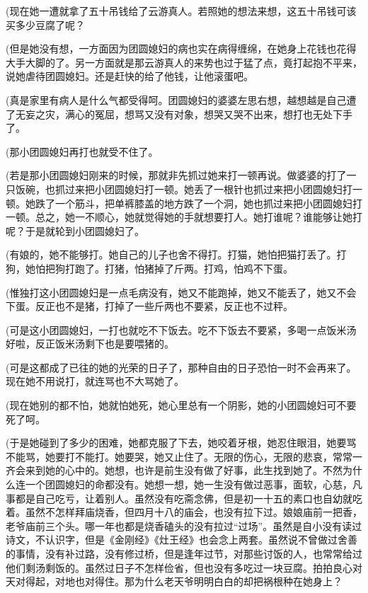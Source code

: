 \par (现在她一遭就拿了五十吊钱给了云游真人。若照她的想法来想，这五十吊钱可该买多少豆腐了呢？
\par (但是她没有想，一方面因为团圆媳妇的病也实在病得缠绵，在她身上花钱也花得大手大脚的了。另一方面就是那云游真人的来势也过于猛了点，竟打起抱不平来，说她虐待团圆媳妇。还是赶快的给了他钱，让他滚蛋吧。
\par (真是家里有病人是什么气都受得呵。团圆媳妇的婆婆左思右想，越想越是自己遭了无妄之灾，满心的冤屈，想骂又没有对象，想哭又哭不出来，想打也无处下手了。
\par (那小团圆媳妇再打也就受不住了。
\par (若是那小团圆媳妇刚来的时候，那就非先抓过她来打一顿再说。做婆婆的打了一只饭碗，也抓过来把小团圆媳妇打一顿。她丢了一根针也抓过来把小团圆媳妇打一顿。她跌了一个筋斗，把单裤膝盖的地方跌了一个洞，她也抓过来把小团圆媳妇打一顿。总之，她一不顺心，她就觉得她的手就想要打人。她打谁呢？谁能够让她打呢？于是就轮到小团圆媳妇了。
\par (有娘的，她不能够打。她自己的儿子也舍不得打。打猫，她怕把猫打丢了。打狗，她怕把狗打跑了。打猪，怕猪掉了斤两。打鸡，怕鸡不下蛋。
\par (惟独打这小团圆媳妇是一点毛病没有，她又不能跑掉，她又不能丢了，她又不会下蛋。反正也不是猪，打掉了一些斤两也不要紧，反正也不过秤。
\par (可是这小团圆媳妇，一打也就吃不下饭去。吃不下饭去不要紧，多喝一点饭米汤好啦，反正饭米汤剩下也是要喂猪的。
\par (可是这都成了已往的她的光荣的日子了，那种自由的日子恐怕一时不会再来了。现在她不用说打，就连骂也不大骂她了。
\par (现在她别的都不怕，她就怕她死，她心里总有一个阴影，她的小团圆媳妇可不要死了呵。
\par (于是她碰到了多少的困难，她都克服了下去，她咬着牙根，她忍住眼泪，她要骂不能骂，她要打不能打。她要哭，她又止住了。无限的伤心，无限的悲哀，常常一齐会来到她的心中的。她想，也许是前生没有做了好事，此生找到她了。不然为什么连一个团圆媳妇的命都没有。她想一想，她一生没有做过恶事，面软，心慈，凡事都是自己吃亏，让着别人。虽然没有吃斋念佛，但是初一十五的素口也自幼就吃着。虽然不怎样拜庙烧香，但四月十八的庙会，也没有拉下过。娘娘庙前一把香，老爷庙前三个头。哪一年也都是烧香磕头的没有拉过“过场”。虽然是自小没有读过诗文，不认识字，但是《金刚经》《灶王经》也会念上两套。虽然说不曾做过舍善的事情，没有补过路，没有修过桥，但是逢年过节，对那些讨饭的人，也常常给过他们剩汤剩饭的。虽然过日子不怎样俭省，但也没有多吃过一块豆腐。拍拍良心对天对得起，对地也对得住。那为什么老天爷明明白白的却把祸根种在她身上？
